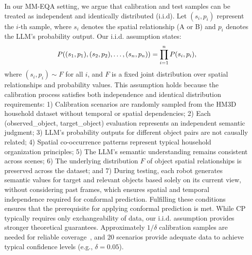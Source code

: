 In our MM-EQA setting, we argue that calibration and test samples can be treated as independent and identically distributed (i.i.d). Let $(s_i, p_i)$ represent the $i$-th sample, where $s_i$ denotes the spatial relationship (A or B) and $p_i$ denotes the LLM's probability output. Our i.i.d. assumption states:
\vspace{-0.15cm}
\begin{equation}
P((s_1, p_1), (s_2, p_2), \ldots, (s_n, p_n)) = \prod_{i=1}^{n} P(s_i, p_i),
\vspace{-0.15cm}
\end{equation}
where $(s_i, p_i) \sim F$ for all $i$, and $F$ is a fixed joint distribution over spatial relationships and probability values. 
This assumption holds because the calibration process satisfies both independence and identical distribution requirements: 
1) Calibration scenarios are randomly sampled from the HM3D household dataset without temporal or spatial dependencies; 
2) Each (observed\_object, target\_object) evaluation represents an independent semantic judgment; 
3) LLM's probability outputs for different object pairs are not causally related; 
4) Spatial co-occurrence patterns represent typical household organization principles; 
5) The LLM's semantic understanding remains consistent across scenes; 
6) The underlying distribution $F$ of object spatial relationships is preserved across the dataset; 
and 7) During testing, each robot generates semantic values for target and relevant objects based solely on its current view, without considering past frames, which ensures spatial and temporal independence required for conformal prediction.
Fulfilling these conditions ensures that the prerequisite for applying conformal prediction is met.
While CP typically requires only exchangeability of data, our i.i.d. assumption provides stronger theoretical guarantees. 
Approximately $1/\delta$ calibration samples are needed for reliable coverage~\cite{luo2024sample}, and 20 scenarios provide adequate data to achieve typical confidence levels (e.g., $\delta = 0.05$).

